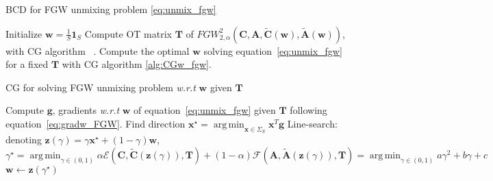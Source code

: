 \documentclass{article}
\def\eqref#1{equation~\ref{#1}}
\def\vg{{\bm{g}}}
\def\vw{{\bm{w}}}
\def\vx{{\bm{x}}}
\def\vz{{\bm{z}}}
\def\mA{{\bm{A}}}
\def\mC{{\bm{C}}}
\def\mT{{\bm{T}}}
\DeclareMathOperator*{\argmin}{arg\,min}
\begin{document}
	\begin{algorithm}[H]
		\caption{BCD for FGW unmixing problem \ref{eq:unmix_fgw}}
		\label{alg:BCD_fgw}
		\begin{algorithmic}[1]
			\STATE Initialize $\vw=\frac{1}{S}\mathbf{1}_S$
			\REPEAT
			\STATE Compute OT matrix $\mT$ of $FGW_{2,\alpha}^2\left(\mC,\mA, \widetilde{\mC}(\vw), \widetilde{\mA}(\vw)\right)$, with CG algorithm ~\citep[Alg.1 \& 2]{vayer-fused-2018}.
			\STATE Compute the optimal $\vw$ solving \eqref{eq:unmix_fgw} for a fixed
			$\mT$ with CG algorithm \ref{alg:CGw_fgw}.
		\end{algorithmic}
	\end{algorithm}
	\vspace{-4mm}
	\begin{algorithm}[H]
		\caption{CG for solving FGW unmixing problem \emph{w.r.t} $\vw$ given $\mT$}
		\label{alg:CGw_fgw}
		\begin{algorithmic}[1]
			\REPEAT
			\STATE Compute $\vg$, gradients  \emph{w.r.t} $\vw$ of \eqref{eq:unmix_fgw} given $\mT$ following \eqref{eq:gradw_FGW}.
			\STATE Find direction $\vx^{\star}= \argmin_{\vx\in \Sigma_S} \vx^T\vg$ 
			\STATE Line-search: denoting $\vz(\gamma) = \gamma \vx^{\star} + (1 - \gamma)\vw$,
			\begin{equation}\label{eq:linesearchGW}
			\gamma^\star = \argmin_{\gamma \in (0,1)} \alpha \mathcal{E}(\mC,\widetilde{\mC}(\vz(\gamma)), \mT) + (1-\alpha)\mathcal{F}(\mA,\widetilde{\mA}(\vz(\gamma)), \mT)= \argmin_{\gamma \in (0,1)} a \gamma^2 + b \gamma +c
			\end{equation}
			\STATE $\vw \leftarrow \vz(\gamma^\star)$
		\end{algorithmic}
	\end{algorithm}
	
\end{document}
